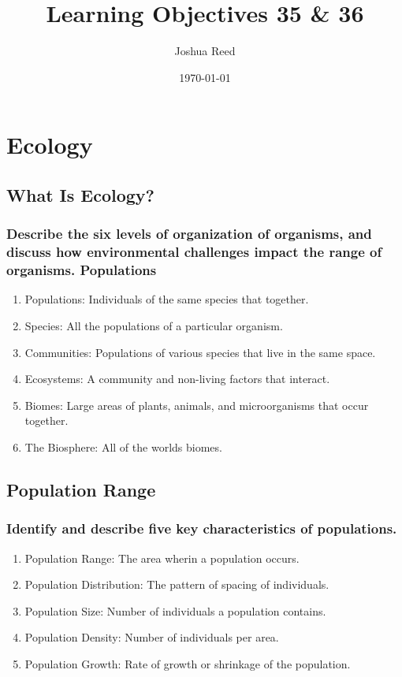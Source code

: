 \documentclass[a4paper]{article}
\title{Learning Objectives 35 \& 36}
\author{Joshua Reed}
\date{\today}
\begin{document}
\maketitle


\section{Ecology}
\subsection{What Is Ecology?}
\subsubsection{Describe the six levels of organization of organisms, and discuss how environmental challenges impact the range of organisms.
Populations}
\begin{enumerate}
\item Populations: Individuals of the same species that together.

\item Species: All the populations of a particular organism.

\item Communities: Populations of various species that live in the same space.

\item Ecosystems: A community and non-living factors that interact.

\item Biomes: Large areas of plants, animals, and microorganisms that occur together.

\item The Biosphere: All of the worlds biomes.
\end{enumerate}

\subsection{Population Range}
\subsubsection{Identify and describe five key characteristics of populations.}
\begin{enumerate}
  \item Population Range: The area wherin a population occurs.
  \item Population Distribution: The pattern of spacing of individuals.
  \item Population Size: Number of individuals a population contains.
  \item Population Density: Number of individuals per area.
  \item Population Growth: Rate of growth or shrinkage of the population.
\end{enumerate}
\end{document}
